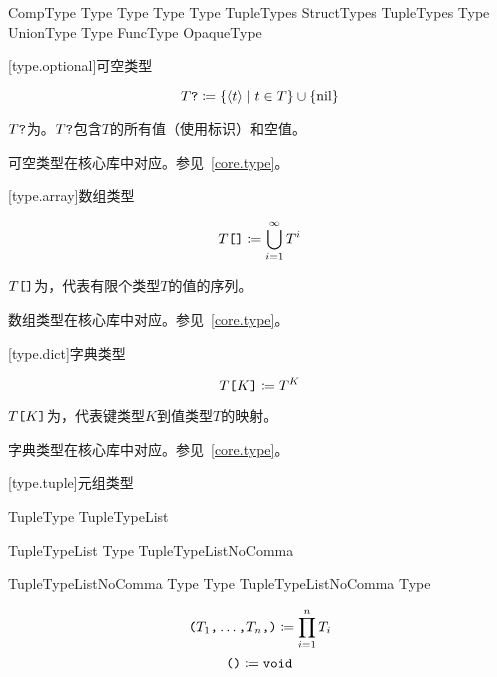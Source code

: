 \begin{bnf}{CompType}
    Type  \br
    Type \terminal{[} \terminal{]} \br
    Type \terminal{[} Type \terminal{]} \br
    \terminal{(} TupleTypes\bnfs \terminal{)} \br
    \terminal{\{} StructTypes \terminal{\}} \br
    \terminal{(} TupleTypes\bnfs \terminal{)} \terminal{->} Type \br
    UnionType \br
    Type \terminal{\&} \br
    FuncType \br
    OpaqueType
\end{bnf}

[type.optional]{可空类型}

$$ T\texttt{?} \coloneqq \{ \langle t \rangle \mid t \in T \} \cup \{ \mathrm{nil} \} $$

\pnum
$T\texttt{?}$为。$T\texttt{?}$包含$T$的所有值（使用标识）和空值。

\pnum
可空类型在核心库中对应。参见~\ref{core.type}。

[type.array]{数组类型}

$$ T\texttt{[]} \coloneqq \bigcup^\infty_{i=1} T^i $$

\pnum
$T\texttt{[]}$为，代表有限个类型$T$的值的序列。

\pnum
数组类型在核心库中对应。参见~\ref{core.type}。

[type.dict]{字典类型}

$$ T\texttt{[}K\texttt{]} \coloneqq T^K $$

\pnum
$T\texttt{[}K\texttt{]}$为，代表键类型$K$到值类型$T$的映射。

\pnum
字典类型在核心库中对应。参见~\ref{core.type}。

[type.tuple]{元组类型}

\begin{bnf}{TupleType}
    \terminal{(} TupleTypeList \terminal{)}
\end{bnf}

\begin{bnf}{TupleTypeList}
    Type \terminal{,} \br
    TupleTypeListNoComma \terminal{,}\bnfq
\end{bnf}

\begin{bnf}{TupleTypeListNoComma}
    Type \terminal{,} Type \br
    TupleTypeListNoComma \terminal{,} Type
\end{bnf}

$$ \texttt{(}T_1\texttt{,} \ldots\texttt{,} T_n\texttt{,}\texttt{)} \coloneqq \prod^n_{i=1} T_i $$
$$ \texttt{()} \coloneqq \texttt{void} $$


